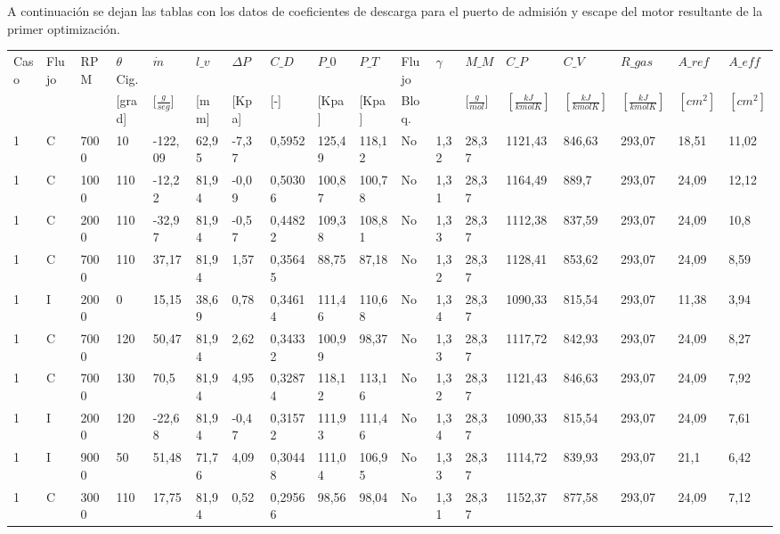 A continuación se dejan las tablas con los datos de coeficientes de descarga
para el puerto de admisión y escape del motor resultante de la primer
optimización.

{\tiny
\begin{landscape}
    \begin{longtable}{llllllllllllllllll} \toprule
    Caso & Flujo & RPM & $\theta$ Cig. & $\dot{m}$ & $l\_v$ & $\Delta P$ & $C\_D$ & $P\_0$ & $P\_T$ & Flujo & $\gamma$ & $M\_M$ & $C\_P$ & $C\_V$ & $R\_{gas}$ & $A\_{ref}$ & $A\_{eff}$ \\
     &  &  & [grad] & [$\frac{g}{seg}$] & [mm] & [Kpa] & [-] & [Kpa] & [Kpa] & Bloq. &  & [$\frac{g}{mol}$] & $[\frac{kJ}{kmol K}]$ & $[\frac{kJ}{kmol K}]$ & $[\frac{kJ}{kmol K}]$ & $[cm^2]$ & $[cm^2]$ \\ \midrule
    1 & C & 7000 & 10 & -122,09 & 62,95 & -7,37 & 0,5952 & 125,49 & 118,12 & No & 1,32 & 28,37 & 1121,43 & 846,63 & 293,07 & 18,51 & 11,02 \\
    1 & C & 1000 & 110 & -12,22 & 81,94 & -0,09 & 0,50306 & 100,87 & 100,78 & No & 1,31 & 28,37 & 1164,49 & 889,7 & 293,07 & 24,09 & 12,12 \\
    1 & C & 2000 & 110 & -32,97 & 81,94 & -0,57 & 0,44822 & 109,38 & 108,81 & No & 1,33 & 28,37 & 1112,38 & 837,59 & 293,07 & 24,09 & 10,8 \\
    1 & C & 7000 & 110 & 37,17 & 81,94 & 1,57 & 0,35645 & 88,75 & 87,18 & No & 1,32 & 28,37 & 1128,41 & 853,62 & 293,07 & 24,09 & 8,59 \\
    1 & I & 2000 & 0 & 15,15 & 38,69 & 0,78 & 0,34614 & 111,46 & 110,68 & No & 1,34 & 28,37 & 1090,33 & 815,54 & 293,07 & 11,38 & 3,94 \\
    1 & C & 7000 & 120 & 50,47 & 81,94 & 2,62 & 0,34332 & 100,99 & 98,37 & No & 1,33 & 28,37 & 1117,72 & 842,93 & 293,07 & 24,09 & 8,27 \\
    1 & C & 7000 & 130 & 70,5 & 81,94 & 4,95 & 0,32874 & 118,12 & 113,16 & No & 1,32 & 28,37 & 1121,43 & 846,63 & 293,07 & 24,09 & 7,92 \\
    1 & I & 2000 & 120 & -22,68 & 81,94 & -0,47 & 0,31572 & 111,93 & 111,46 & No & 1,34 & 28,37 & 1090,33 & 815,54 & 293,07 & 24,09 & 7,61 \\
    1 & I & 9000 & 50 & 51,48 & 71,76 & 4,09 & 0,30448 & 111,04 & 106,95 & No & 1,33 & 28,37 & 1114,72 & 839,93 & 293,07 & 21,1 & 6,42 \\
    1 & C & 3000 & 110 & 17,75 & 81,94 & 0,52 & 0,29566 & 98,56 & 98,04 & No & 1,31 & 28,37 & 1152,37 & 877,58 & 293,07 & 24,09 & 7,12 \\

\end{longtable}
\end{landscape}}
